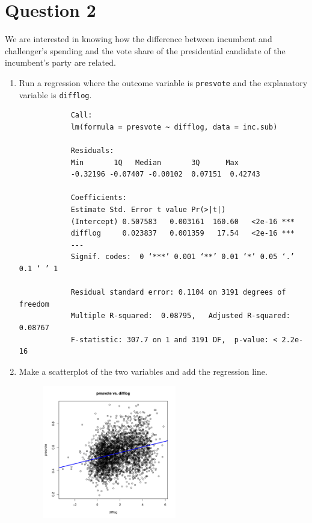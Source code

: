 \documentclass[12pt,letterpaper]{article}
\begin{document}
\section*{Question 2}
\noindent We are interested in knowing how the difference between incumbent and challenger's spending and the vote share of the presidential candidate of the incumbent's party are related.	\vspace{.25cm}
	\begin{enumerate}
	
	
		\item Run a regression where the outcome variable is \texttt{presvote} and the explanatory variable is \texttt{difflog}.	
			\vspace{.25cm}
			  
			\begin{verbatim}
			Call:
			lm(formula = presvote ~ difflog, data = inc.sub)
			
			Residuals:
			Min       1Q   Median       3Q      Max 
			-0.32196 -0.07407 -0.00102  0.07151  0.42743 
			
			Coefficients:
			Estimate Std. Error t value Pr(>|t|)    
			(Intercept) 0.507583   0.003161  160.60   <2e-16 ***
			difflog     0.023837   0.001359   17.54   <2e-16 ***
			---
			Signif. codes:  0 ‘***’ 0.001 ‘**’ 0.01 ‘*’ 0.05 ‘.’ 0.1 ‘ ’ 1
			
			Residual standard error: 0.1104 on 3191 degrees of freedom
			Multiple R-squared:  0.08795,	Adjusted R-squared:  0.08767 
			F-statistic: 307.7 on 1 and 3191 DF,  p-value: < 2.2e-16
		\end{verbatim}
		\vspace{2cm}
	
		
		
		\item Make a scatterplot of the two variables and add the regression line. 	\vspace{5cm}
			\begin{figure}[h!]
			\centering
			\includegraphics[width=0.55\textwidth]{plot_question2.pdf}
			\end{figure}
			\vspace{.5cm}
		

\end{enumerate}
\end{document}
